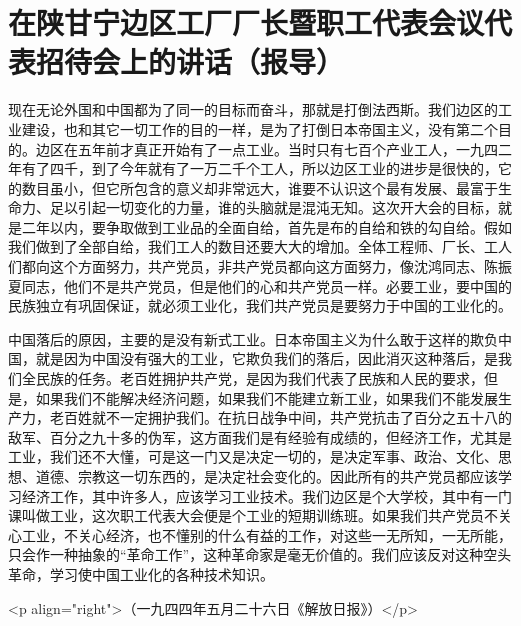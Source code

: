\section[在陕甘宁边区工厂厂长暨职工代表会议代表招待会上的讲话（报导）（一九四四年五月二十二日）]{在陕甘宁边区工厂厂长暨职工代表会议代表招待会上的讲话（报导）}


现在无论外国和中国都为了同一的目标而奋斗，那就是打倒法西斯。我们边区的工业建设，也和其它一切工作的目的一样，是为了打倒日本帝国主义，没有第二个目的。边区在五年前才真正开始有了一点工业。当时只有七百个产业工人，一九四二年有了四千，到了今年就有了一万二千个工人，所以边区工业的进步是很快的，它的数目虽小，但它所包含的意义却非常远大，谁要不认识这个最有发展、最富于生命力、足以引起一切变化的力量，谁的头脑就是混沌无知。这次开大会的目标，就是二年以内，要争取做到工业品的全面自给，首先是布的自给和铁的勾自给。假如我们做到了全部自给，我们工人的数目还要大大的增加。全体工程师、厂长、工人们都向这个方面努力，共产党员，非共产党员都向这方面努力，像沈鸿同志、陈振夏同志，他们不是共产党员，但是他们的心和共产党员一样。必要工业，要中国的民族独立有巩固保证，就必须工业化，我们共产党员是要努力于中国的工业化的。

中国落后的原因，主要的是没有新式工业。日本帝国主义为什么敢于这样的欺负中国，就是因为中国没有强大的工业，它欺负我们的落后，因此消灭这种落后，是我们全民族的任务。老百姓拥护共产党，是因为我们代表了民族和人民的要求，但是，如果我们不能解决经济问题，如果我们不能建立新工业，如果我们不能发展生产力，老百姓就不一定拥护我们。在抗日战争中间，共产党抗击了百分之五十八的敌军、百分之九十多的伪军，这方面我们是有经验有成绩的，但经济工作，尤其是工业，我们还不大懂，可是这一门又是决定一切的，是决定军事、政治、文化、思想、道德、宗教这一切东西的，是决定社会变化的。因此所有的共产党员都应该学习经济工作，其中许多人，应该学习工业技术。我们边区是个大学校，其中有一门课叫做工业，这次职工代表大会便是个工业的短期训练班。如果我们共产党员不关心工业，不关心经济，也不懂别的什么有益的工作，对这些一无所知，一无所能，只会作一种抽象的“革命工作”，这种革命家是毫无价值的。我们应该反对这种空头革命，学习使中国工业化的各种技术知识。

<p align="right">（一九四四年五月二十六日《解放日报》）</p>

